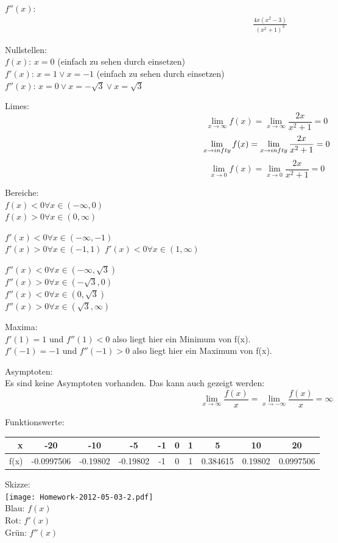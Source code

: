 \documentclass[a4paper]{scrartcl}
\begin{document}
\begin{enumerate}
\(f''(x)\):
\begin{align}
&\frac {4x(x^2-3)} {(x^2+1)^3}
\end{align}

Nullstellen:\\
\(f(x)\): \(x = 0\) (einfach zu sehen durch einsetzen)\\
\(f'(x)\): \(x = 1 \vee x = -1\) (einfach zu sehen durch einsetzen)\\
\(f''(x)\): \(x = 0 \vee x = -\sqrt 3 \vee x = \sqrt 3\)

Limes:\\
\[\lim_{x \to \infty} f(x) = \lim_{x \to \infty} \frac {2x} {x^2+1} = 0\]
\[\lim_{x \to \-infty} f(x) = \lim_{x \to \-infty} \frac {2x} {x^2+1} = 0\]
\[\lim_{x \to 0} f(x) = \lim_{x \to 0} \frac {2x} {x^2+1} = 0\]

Bereiche:\\
\(f(x) < 0 \forall x \in (-\infty,0)\)\\
\(f(x) > 0 \forall x \in (0,\infty)\)

\(f'(x) < 0 \forall x \in (-\infty,-1)\)\\
\(f'(x) > 0 \forall x \in (-1,1)\)
\(f'(x) < 0 \forall x \in (1,\infty)\)


\(f''(x) < 0 \forall x \in (-\infty,\sqrt 3)\)\\
\(f''(x) > 0 \forall x \in (-\sqrt 3,0)\)\\
\(f''(x) < 0 \forall x \in (0, \sqrt 3)\)\\
\(f''(x) > 0 \forall x \in (\sqrt 3, \infty)\)

Maxima:\\
\(f'(1) = 1\) und \(f''(1) < 0\) also liegt hier ein Minimum von f(x).\\
\(f'(-1) = -1\) und \(f''(-1) > 0\) also liegt hier ein Maximum von f(x).

Asymptoten:\\
Es sind keine Asymptoten vorhanden. Das kann auch gezeigt werden:
\[\lim_{x \to \infty} \frac {f(x)} x = \lim_{x \to -\infty} \frac {f(x)} x = \infty\]

Funktionswerte:\\
\begin{tabular}{r|c|c|c|c|c|c|c|c|c}
x & -20 & -10 & -5 & -1 & 0 & 1 & 5 & 10 & 20\\
\hline
f(x) & -0.0997506 & -0.19802 & -0.19802 & -1 & 0 & 1 & 0.384615 & 0.19802 & 0.0997506
\end{tabular}

Skizze:\\
\hspace*{-1.5in}
\texttt{[image: Homework-2012-05-03-2.pdf]}\\
Blau: \(f(x)\)\\
Rot: \(f'(x)\)\\
Grün: \(f''(x)\)

\end{enumerate}
\end{document}
